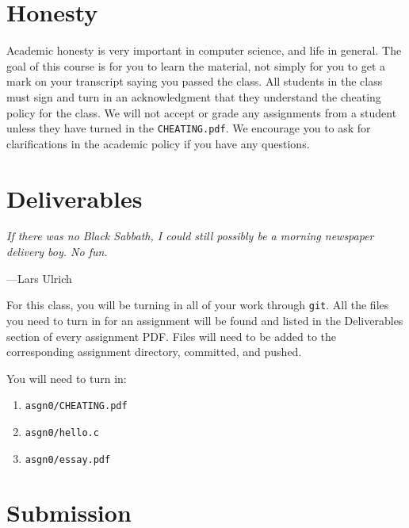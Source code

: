 \documentclass[11pt]{article}
\newcommand\asgn[0]{asgn0}
\begin{document}


\section{Honesty}

Academic honesty is very important in computer science, and life in general. The
goal of this course is for you to learn the material, not simply for you to get
a mark on your transcript saying you passed the class. All students in the class
must sign and turn in an acknowledgment that they understand the cheating policy
for the class. We will not accept or grade any assignments from a student unless
they have turned in the \texttt{CHEATING.pdf}. We encourage you to ask for
clarifications in the academic policy if you have any questions.

\section{Deliverables}

\epigraph{\emph{If there was no Black Sabbath, I could still possibly be a
morning newspaper delivery boy. No fun.}}{---Lars Ulrich}

\noindent For this class, you will be turning in all of your work through
\texttt{git}. All the files you need to turn in for an assignment will be found
and listed in the Deliverables section of every assignment PDF. Files will need
to be added to the corresponding assignment directory, committed, and pushed.

You will need to turn in:
\begin{enumerate}
	\item \texttt{\asgn/CHEATING.pdf}
	\item \texttt{\asgn/hello.c}
	\item \texttt{\asgn/essay.pdf}
\end{enumerate}

\section{Submission}

\end{document}
